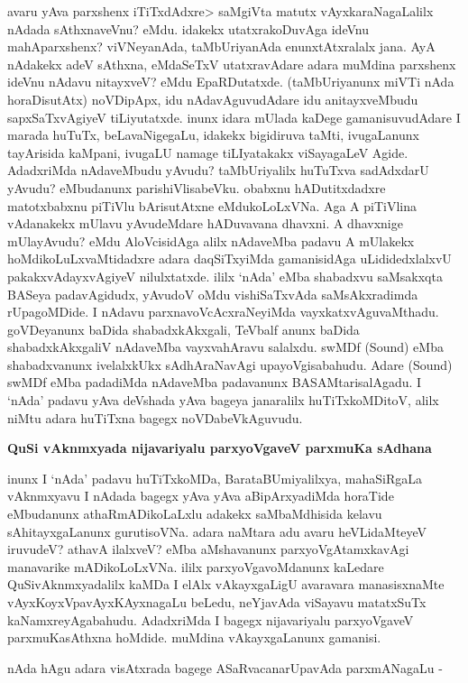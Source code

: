 avaru yAva parxshenx iTiTxdAdxre> saMgiVta matutx vAyxkaraNagaLalilx nAdada sAthxnaveVnu? eMdu. idakekx utatxrakoDuvAga ideVnu mahAparxshenx? viVNeyanAda, taMbUriyanAda enunxtAtxralalx jana. AyA nAdakekx adeV sAthxna, eMdaSeTxV utatxravAdare adara muMdina parxshenx ideVnu nAdavu nitayxveV? eMdu EpaRDutatxde. (taMbUriyanunx miVTi nAda horaDisutAtx) noVDipApx, idu nAdavAguvudAdare idu anitayxveMbudu sapxSaTxvAgiyeV tiLiyutatxde. inunx idara mUlada kaDege gamanisuvudAdare I marada huTuTx, beLavaNigegaLu, idakekx bigidiruva taMti, ivugaLanunx tayArisida kaMpani, ivugaLU namage tiLIyatakakx viSayagaLeV Agide. AdadxriMda nAdaveMbudu yAvudu? taMbUriyalilx huTuTxva sadAdxdarU yAvudu? eMbudanunx parishiVlisabeVku. obabxnu hADutitxdadxre matotxbabxnu piTiVlu bArisutAtxne eMdukoLoLxVNa. Aga A piTiVlina vAdanakekx mUlavu yAvudeMdare hADuvavana dhavxni. A dhavxnige mUlayAvudu? eMdu AloVcisidAga alilx nAdaveMba padavu A mUlakekx hoMdikoLuLxvaMtidadxre adara daqSiTxyiMda gamanisidAga uLididedxlalxvU pakakxvAdayxvAgiyeV nilulxtatxde. ililx `nAda' eMba shabadxvu saMsakxqta BASeya padavAgidudx, yAvudoV oMdu vishiSaTxvAda saMsAkxradimda rUpagoMDide. I nAdavu parxnavoVcAcxraNeyiMda vayxkatxvAguvaMthadu. goVDeyanunx baDida shabadxkAkxgali, TeVbalf anunx baDida shabadxkAkxgaliV nAdaveMba vayxvahAravu salalxdu. swMDf {\rm (Sound)} eMba shabadxvanunx ivelalxkUkx sAdhAraNavAgi upayoVgisabahudu. Adare {\rm (Sound)} swMDf eMba padadiMda nAdaveMba padavanunx BASAMtarisalAgadu. I `nAda' padavu yAva deVshada yAva bageya janaralilx huTiTxkoMDitoV, alilx niMtu adara huTiTxna bagegx noVDabeVkAguvudu.

{\bf QuSi vAknmxyada nijavariyalu parxyoVgaveV parxmuKa sAdhana}

inunx I `nAda' padavu huTiTxkoMDa, BarataBUmiyalilxya, mahaSiRgaLa vAknmxyavu I nAdada bagegx yAva yAva aBipArxyadiMda horaTide eMbudanunx athaRmADikoLaLxlu adakekx saMbaMdhisida kelavu sAhitayxgaLanunx gurutisoVNa. adara naMtara adu avaru heVLidaMteyeV iruvudeV? athavA ilalxveV? eMba aMshavanunx parxyoVgAtamxkavAgi manavarike mADikoLoLxVNa. ililx parxyoVgavoMdanunx kaLedare QuSivAknmxyadalilx kaMDa I elAlx vAkayxgaLigU avaravara manasisxnaMte vAyxKoyxVpavAyxKAyxnagaLu beLedu, neYjavAda viSayavu matatxSuTx kaNamxreyAgabahudu. AdadxriMda I bagegx nijavariyalu parxyoVgaveV parxmuKasAthxna hoMdide. muMdina vAkayxgaLanunx gamanisi.

nAda hAgu adara visAtxrada bagege ASaRvacanarUpavAda parxmANagaLu -


